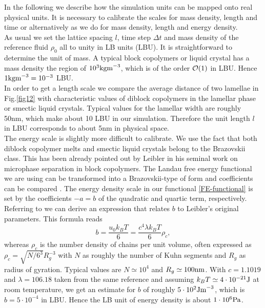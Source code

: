 \documentclass[8.5pt,twoside,twocolumn]{article}
\newcommand{\e}[1]{\cdot10^{#1}}
\begin{document}
In the following we describe how the simulation units can be mapped onto real physical units.
It is necessary to calibrate the scales for mass density, length and time or alternatively as we do for mass density, length and energy density.\\
As usual we set the lattice spacing $l$, time step $\Delta t$ and mass density of the reference fluid $\rho_0$ all to unity in LB units (LBU).
It is straightforward to determine the unit of mass. 
A typical block copolymers or liquid crystal has a mass density the region of $10^3 {\rm kg m}^{-3}$, which is of the order ${\cal O}(1)$ in LBU.
Hence $1 {\rm kg m}^{-3}=10^{-3}$ LBU.\\
In order to get a length scale we compare the average distance of two lamellae in Fig.\ref{fig12} with characteristic values of diblock copolymers in the lamellar phase or smectic liquid crystals.
Typical values for the lamellar width are roughly 50nm, which make about 10 LBU in our simulation.
Therefore the unit length $l$ in LBU corresponds to about 5nm in physical space.\\
The energy scale is slightly more difficult to calibrate.
We use the fact that both diblock copolymer melts and smectic liquid crystals belong to the Brazovskii class.
This has been already pointed out by Leibler \cite{Leibler80} in his seminal work on microphase separation in block copolymers.
The Landau free energy functional we are using can be transformed into a Brazovskii-type of form and coefficients can be compared \cite{Xu05, Fredrickson89}.
The energy density scale in our functional \ref{FE-functional} is set by the coefficients $-a=b$ of the quadratic and quartic term, respectively.
Referring to \cite{Fredrickson89} we can derive an expression that relates $b$ to Leibler's original parameters.
This formula reads 
\begin{equation}
b=\frac{u_0 k_B T}{6}=\frac{c^4\lambda k_B T}{6} \rho_c,
\end{equation}
whereas $\rho_c$ is the number density of chains per unit volume,
often expressed as $\rho_c=\sqrt{N/6^3} R_g^{-3}$ with $N$ as roughly the number of Kuhn segments and $R_g$ as radius of gyration.
Typical values are $N\simeq10^4$ and $R_g\simeq 100{\rm nm}$.
With $c=1.1019$ and $\lambda=106.18$ taken from the same reference and assuming $k_B T\simeq 4\e{-21} {\rm J}$ at room temperature, we get an estimate for $b$ of roughly $5\e{2} {\rm J m}^{-3}$, which is $b=5\e{-4}$ in LBU.
Hence the LB unit of energy density is about $1\e{6} \rm{Pa}$.\\
\end{document}

